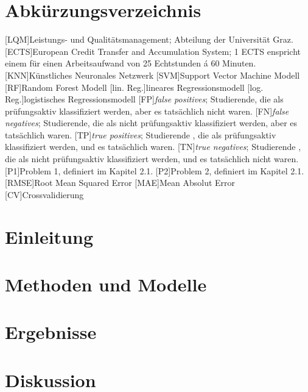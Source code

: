 \documentclass[
    fontsize=12pt,
    paper=A4,
    parskip=full, %
    bibliography=totoc,
    abstract=on,
    listof=totoc,
]{scrreprt} %
\begin{document}
    \chapter*{Abk\"urzungsverzeichnis}
    \begin{acronym}
        [LQM]{Leistungs- und Qualit\"atsmanagement; Abteilung der Universität Graz.}
        [ECTS]{European Credit Transfer and Accumulation System; 1 ECTS enspricht einem f\"ur einen Arbeitsaufwand von 25 Echtstunden \'a 60 Minuten.}
        [KNN]{K\"unstliches Neuronales Netzwerk}
        [SVM]{Support Vector Machine Modell}
        [RF]{Random Forest Modell}
        [lin. Reg.]{lineares Regressionsmodell}
        [log. Reg.]{logistisches Regressionsmodell}
        [FP]{\textit{false positives}; Studierende, die als pr\"ufungsaktiv klassifiziert werden, aber es tats\"achlich nicht waren.}
        [FN]{\textit{false negatives}; Studierende, die als nicht pr\"ufungsaktiv klassifiziert werden, aber es tats\"achlich waren.}
        [TP]{\textit{true positives}; Studierende , die als pr\"ufungsaktiv klassifiziert werden, und es tats\"achlich waren.}
        [TN]{\textit{true negatives}; Studierende , die als nicht pr\"ufungsaktiv klassifiziert werden, und es tats\"achlich nicht waren.}
        [P1]{Problem 1, definiert im Kapitel 2.1.}
        [P2]{Problem 2, definiert im Kapitel 2.1.}
        [RMSE]{Root Mean Squared Error}
        [MAE]{Mean Absolut Error}
        [CV]{Crossvalidierung}
        
    \end{acronym}



    \chapter{Einleitung}
     
        
        
    

    \chapter{Methoden und Modelle}
    
    
    
    
    
    
    
    


    \chapter{Ergebnisse}
    


    \chapter{Diskussion}
    

    \begin{doublespace}
        \printbibliography
    \end{doublespace}
    


    
\end{document}
